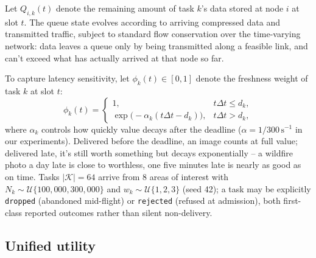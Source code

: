 Let $Q_{i,k}(t)$ denote the remaining amount of task $k$'s data stored at node $i$ at slot $t$. The queue state evolves according to arriving compressed data and transmitted traffic, subject to standard flow conservation over the time-varying network: data leaves a queue only by being transmitted along a feasible link, and can't exceed what has actually arrived at that node so far.

To capture latency sensitivity, let $\phi_k(t) \in [0,1]$ denote the freshness weight of task $k$ at slot $t$:
\begin{equation}
\phi_k(t) =
\begin{cases}
1, & t \Delta t \le d_k, \\
\exp\!\big(-\alpha_k (t \Delta t - d_k)\big), & t \Delta t > d_k,
\end{cases}
\end{equation}
where $\alpha_k$ controls how quickly value decays after the deadline ($\alpha = 1/300\,\mathrm{s}^{-1}$ in our experiments). Delivered before the deadline, an image counts at full value; delivered late, it's still worth something but decays exponentially -- a wildfire photo a day late is close to worthless, one five minutes late is nearly as good as on time. Tasks $|\mathcal{K}| = 64$ arrive from 8 areas of interest with $N_k \sim \mathcal{U}\{100{,}000, 300{,}000\}$ and $w_k \sim \mathcal{U}\{1,2,3\}$ (seed 42); a task may be explicitly \texttt{dropped} (abandoned mid-flight) or \texttt{rejected} (refused at admission), both first-class reported outcomes rather than silent non-delivery.

\subsection{Unified utility}
\label{sec:unified-utility}

